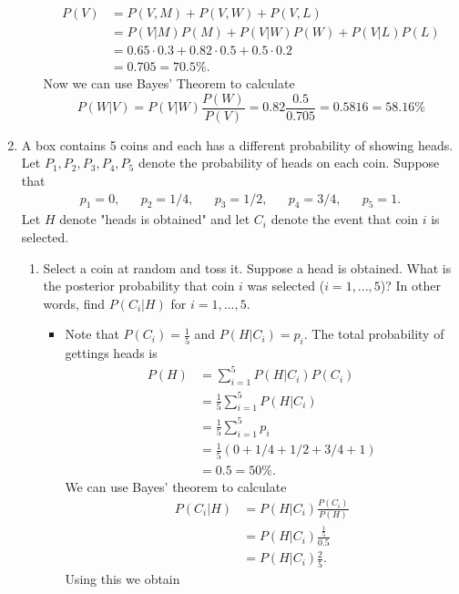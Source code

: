 \documentclass{article}
\begin{document}
\begin{enumerate}
\begin{itemize}
			$$
			\begin{aligned}
			P(V) &= P(V, M) + P(V, W) + P(V, L) \\
			&= P(V|M)P(M) + P(V|W)P(W) + P(V|L)P(L) \\
			&= 0.65 \cdot 0.3 + 0.82 \cdot 0.5 + 0.5 \cdot 0.2 \\
			&= 0.705 = 70.5\%.
			\end{aligned}
			$$
			Now we can use Bayes' Theorem to calculate
			$$
			P(W|V) = P(V|W) \frac{P(W)}{P(V)} = 0.82 \frac{0.5}{0.705} = 0.5816 = 58.16\%
			$$
		\end{itemize}
	\item A box contains 5 coins and each has a different probability of showing heads. Let $P_1, P_2, P_3, P_4, P_5$ denote the probability of heads on each coin. Suppose that
	$$
	\begin{aligned}
	p_1 = 0,&& p_2 = 1/4,&& p_3 = 1/2,&& p_4 = 3/4,&& p_5 = 1.
	\end{aligned}
	$$
	Let $H$ denote "heads is obtained" and let $C_i$ denote the event that coin $i$ is selected.
	\begin{enumerate}
		\item Select a coin at random and toss it. Suppose a head is obtained. What is the posterior probability that coin $i$ was selected ($i = 1, ..., 5$)? In other words, find $P(C_i|H)$ for $i = 1, ..., 5$.
			\begin{itemize}
				\item Note that $P(C_i) = \frac{1}{5}$ and $P(H|C_i) = p_i$. The total probability of gettings heads is
				$$
				\begin{aligned}
				P(H) &= \sum_{i = 1}^5 P(H|C_i)P(C_i) \\
				&= \frac{1}{5} \sum_{i = 1}^5 P(H|C_i) \\
				&= \frac{1}{5} \sum_{i = 1}^5 p_i \\
				&= \frac{1}{5} (0 + 1/4 + 1/2 + 3/4 + 1) \\
				&= 0.5 = 50\%.
				\end{aligned}
				$$
				We can use Bayes' theorem to calculate
				$$
				\begin{aligned}
				P(C_i|H) &= P(H|C_i) \frac{P(C_i)}{P(H)} \\
				&= P(H|C_i) \frac{\frac{1}{5}}{0.5} \\
				&= P(H|C_i) \frac{2}{5}.
				\end{aligned}
				$$
				Using  this we obtain
				\begin{center}
				\begin{tabular}{|c|c|c|c|c|c|}

\end{tabular}
\end{center}
\end{itemize}
\end{enumerate}
\end{enumerate}
\end{document}
